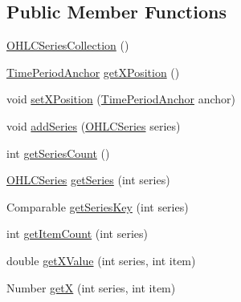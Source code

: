 \subsection*{Public Member Functions}
\begin{DoxyCompactItemize}
\item 
\mbox{\hyperlink{classorg_1_1jfree_1_1data_1_1time_1_1ohlc_1_1_o_h_l_c_series_collection_ab531f7b4928283ec31f4cecffe946d3f}{O\+H\+L\+C\+Series\+Collection}} ()
\item 
\mbox{\hyperlink{classorg_1_1jfree_1_1data_1_1time_1_1_time_period_anchor}{Time\+Period\+Anchor}} \mbox{\hyperlink{classorg_1_1jfree_1_1data_1_1time_1_1ohlc_1_1_o_h_l_c_series_collection_aa9df32edddea10c260d024b9b355a1d3}{get\+X\+Position}} ()
\item 
void \mbox{\hyperlink{classorg_1_1jfree_1_1data_1_1time_1_1ohlc_1_1_o_h_l_c_series_collection_a865e3bc31c8989a62138249a145a3c55}{set\+X\+Position}} (\mbox{\hyperlink{classorg_1_1jfree_1_1data_1_1time_1_1_time_period_anchor}{Time\+Period\+Anchor}} anchor)
\item 
void \mbox{\hyperlink{classorg_1_1jfree_1_1data_1_1time_1_1ohlc_1_1_o_h_l_c_series_collection_ad20edefd2a35355fb5276d964655336c}{add\+Series}} (\mbox{\hyperlink{classorg_1_1jfree_1_1data_1_1time_1_1ohlc_1_1_o_h_l_c_series}{O\+H\+L\+C\+Series}} series)
\item 
int \mbox{\hyperlink{classorg_1_1jfree_1_1data_1_1time_1_1ohlc_1_1_o_h_l_c_series_collection_aa6b3cf5922a008e3c39d01282a008a6e}{get\+Series\+Count}} ()
\item 
\mbox{\hyperlink{classorg_1_1jfree_1_1data_1_1time_1_1ohlc_1_1_o_h_l_c_series}{O\+H\+L\+C\+Series}} \mbox{\hyperlink{classorg_1_1jfree_1_1data_1_1time_1_1ohlc_1_1_o_h_l_c_series_collection_ac19683d051b942fe8f9e3f2d8296ee29}{get\+Series}} (int series)
\item 
Comparable \mbox{\hyperlink{classorg_1_1jfree_1_1data_1_1time_1_1ohlc_1_1_o_h_l_c_series_collection_af718b6938348563aade08cce5f70d143}{get\+Series\+Key}} (int series)
\item 
int \mbox{\hyperlink{classorg_1_1jfree_1_1data_1_1time_1_1ohlc_1_1_o_h_l_c_series_collection_a2bff752977bb7e121b5ff080114165d3}{get\+Item\+Count}} (int series)
\item 
double \mbox{\hyperlink{classorg_1_1jfree_1_1data_1_1time_1_1ohlc_1_1_o_h_l_c_series_collection_a528dc828a917fd0ba0fb959cacbaead1}{get\+X\+Value}} (int series, int item)
\item 
Number \mbox{\hyperlink{classorg_1_1jfree_1_1data_1_1time_1_1ohlc_1_1_o_h_l_c_series_collection_aee8614ff104e69820747b4181f7adfc2}{getX}} (int series, int item)

\end{DoxyCompactItemize}
